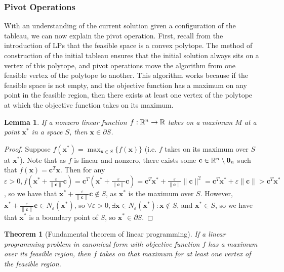 \documentclass[10pt]{article}
\renewcommand{\vec}[1]{\mathbf{#1}}
\newcommand{\R}[1][]{ \ifx&#1& \mathbb{R} \else \mathbb{R}^{#1} \fi }
\newcommand{\x}{\vec{x}}
\newcommand{\vz}[1]{\vec{0}_{#1}}
\renewcommand{\c}{\vec{c}}
\newtheorem{theorem}{Theorem}[section]
\newtheorem{lemma}{Lemma}[section]
\begin{document}
\subsubsection{Pivot Operations}
\label{lp:sa-pivotops}
With an understanding of the current solution given a configuration of the tableau, we can now explain the pivot operation. First, recall from the introduction of LPs that the feasible space is a convex polytope. The method of construction of the initial tableau ensures that the initial solution always sits on a vertex of this polytope, and pivot operations move the algorithm from one feasible vertex of the polytope to another. This algorithm works because if the feasible space is not empty, and the objective function has a maximum on any point in the feasible region, then there exists at least one vertex of the polytope at which the objective function takes on its maximum. 
\begin{lemma}
	\label{lp:sa-pivotops-l1}
	If a nonzero linear function $f:\R[n]\to\R$ takes on a maximum $M$ at a point $\x^*$ in a space $S$, then $\x\in\partial S$.
\end{lemma}
\begin{proof}
	Suppose $f(\x^*) = \max_{\x\in S}\{f(\x)\}$ (i.e. $f$ takes on its maximum over $S$ at $\x^*$). Note that as $f$ is linear and nonzero, there exists some $\c\in\R[n]\setminus\vz{n}$ such that $f(\x) = \c^T\x$. Then for any $\varepsilon>0, f(\x^* + \frac{\varepsilon}{\lVert\c\rVert}\c) = \c^T(\x^*+\frac{\varepsilon}{\lVert\c\rVert}\c) = \c^T\x^* + \frac{\varepsilon}{\lVert\c\rVert}\lVert\c\rVert^2 = \c^T\x^*+\varepsilon\lVert\c\rVert > \c^T\x^*$, so we have that $\x^*+\frac{\varepsilon}{\lVert\c\rVert}\c\notin S$, as $\x^*$ is the maximum over $S$. However, $\x^*+\frac{\varepsilon}{\lVert\c\rVert}\c\in N_\varepsilon(\x^*)$, so $\forall\varepsilon>0,\exists\x\in N_\varepsilon(\x^*): \x\notin S$, and $\x^*\in S$, so we have that $\x^*$ is a boundary point of $S$, so $\x^*\in\partial S$.  
\end{proof}
\begin{theorem}[Fundamental theorem of linear programming]
	If a linear programming problem in canonical form with objective function $f$ has a maximum over its feasible region, then $f$ takes on that maximum for at least one vertex of the feasible region.
\end{theorem}
\end{document}
